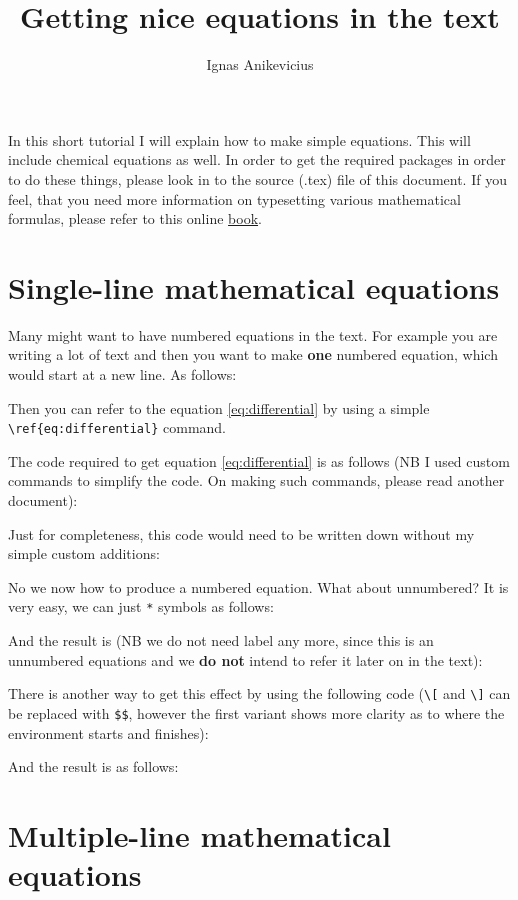\documentclass[a4paper,11pt]{article}
\title{Getting nice equations in the text}
\author{Ignas Anikevicius}
\begin{document}
\maketitle

In this short tutorial I will explain how to make simple equations. This will
include chemical equations as well. In order to get the required packages in
order to do these things, please look in to the source (.tex) file of this
document. If you feel, that you need more information on typesetting various
mathematical formulas, please refer to this online 
\href{https://secure.wikimedia.org/wikibooks/en/wiki/LaTeX/Mathematics}{book}.

\section{Single-line mathematical equations}

Many might want to have numbered equations in the text. For example you are
writing a lot of text and then you want to make \textbf{one} numbered equation,
which would start at a new line. As follows:


Then you can refer to the equation \ref{eq:differential} by using a simple
\verb|\ref{eq:differential}| command.

The code required to get equation \ref{eq:differential} is as follows (NB I used
custom commands to simplify the code. On making such commands, please read
another document):


Just for completeness, this code would need to be written down without my simple
custom additions:


No we now how to produce a numbered equation. What about unnumbered? It is very
easy, we can just \verb|*| symbols as follows:

And the result is (NB we do not need label any more, since this is an unnumbered
equations and we \textbf{do not} intend to refer it later on in the text):


There is another way to get this effect by using the following code (\verb|\[|
and \verb|\]| can be replaced with \verb|$$|, however the first variant shows
more clarity as to where the environment starts and finishes):


And the result is as follows:


\section{Multiple-line mathematical equations}
\end{document}
